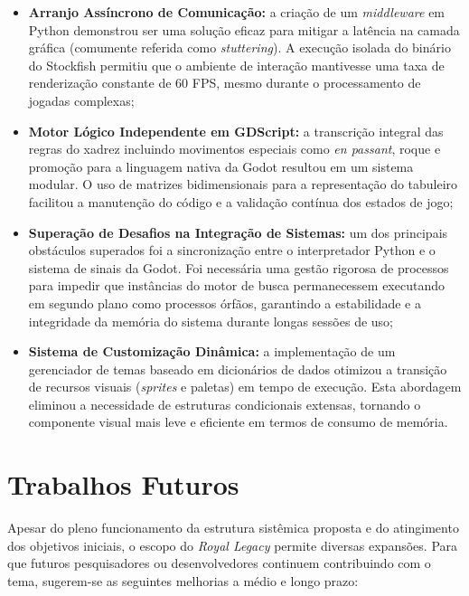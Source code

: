 \begin{itemize}
	\item \textbf{Arranjo Assíncrono de Comunicação:} a criação de um \textit{middleware} em Python demonstrou ser uma solução eficaz para mitigar a latência na camada gráfica (comumente referida como \textit{stuttering}). A execução isolada do binário do Stockfish permitiu que o ambiente de interação mantivesse uma taxa de renderização constante de 60 FPS, mesmo durante o processamento de jogadas complexas;
	
	\item \textbf{Motor Lógico Independente em GDScript:} a transcrição integral das regras do xadrez incluindo movimentos especiais como \textit{en passant}, roque e promoção para a linguagem nativa da Godot resultou em um sistema modular. O uso de matrizes bidimensionais para a representação do tabuleiro facilitou a manutenção do código e a validação contínua dos estados de jogo;
	
	\item \textbf{Superação de Desafios na Integração de Sistemas:} um dos principais obstáculos superados foi a sincronização entre o interpretador Python e o sistema de sinais da Godot. Foi necessária uma gestão rigorosa de processos para impedir que instâncias do motor de busca permanecessem executando em segundo plano como processos órfãos, garantindo a estabilidade e a integridade da memória do sistema durante longas sessões de uso;
	
	\item \textbf{Sistema de Customização Dinâmica:} a implementação de um gerenciador de temas baseado em dicionários de dados otimizou a transição de recursos visuais (\textit{sprites} e paletas) em tempo de execução. Esta abordagem eliminou a necessidade de estruturas condicionais extensas, tornando o componente visual mais leve e eficiente em termos de consumo de memória.
\end{itemize}

\section{Trabalhos Futuros}
\label{secao:trabalhos_futuros}

Apesar do pleno funcionamento da estrutura sistêmica proposta e do atingimento dos objetivos iniciais, o escopo do \textit{Royal Legacy} permite diversas expansões. Para que futuros pesquisadores ou desenvolvedores continuem contribuindo com o tema, sugerem-se as seguintes melhorias a médio e longo prazo:

